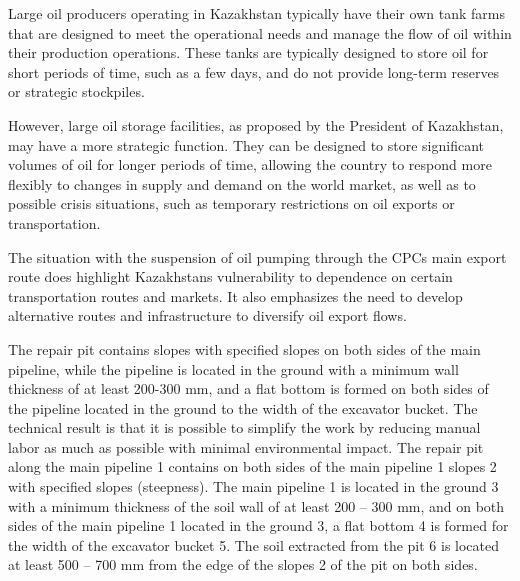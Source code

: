 \begin{multicols}{2}
Large oil producers operating in Kazakhstan typically have their own
tank farms that are designed to meet the operational needs and manage
the flow of oil within their production operations. These tanks are
typically designed to store oil for short periods of time, such as a few
days, and do not provide long-term reserves or strategic stockpiles.

However, large oil storage facilities, as proposed by the President of
Kazakhstan, may have a more strategic function. They can be designed to
store significant volumes of oil for longer periods of time, allowing
the country to respond more flexibly to changes in supply and demand on
the world market, as well as to possible crisis situations, such as
temporary restrictions on oil exports or transportation.

The situation with the suspension of oil pumping through the
CPC\textquotesingle s main export route does highlight
Kazakhstan\textquotesingle s vulnerability to dependence on certain
transportation routes and markets. It also emphasizes the need to
develop alternative routes and infrastructure to diversify oil export
flows.

The repair pit contains slopes with specified slopes on both sides of
the main pipeline, while the pipeline is located in the ground with a
minimum wall thickness of at least 200-300 mm, and a flat bottom is
formed on both sides of the pipeline located in the ground to the width
of the excavator bucket. The technical result is that it is possible to
simplify the work by reducing manual labor as much as possible with
minimal environmental impact. The repair pit along the main pipeline 1
contains on both sides of the main pipeline 1 slopes 2 with specified
slopes (steepness). The main pipeline 1 is located in the ground 3 with
a minimum thickness of the soil wall of at least 200 -- 300 mm, and on
both sides of the main pipeline 1 located in the ground 3, a flat bottom
4 is formed for the width of the excavator bucket 5. The soil extracted
from the pit 6 is located at least 500 -- 700 mm from the edge of the
slopes 2 of the pit on both sides.


\end{multicols}
